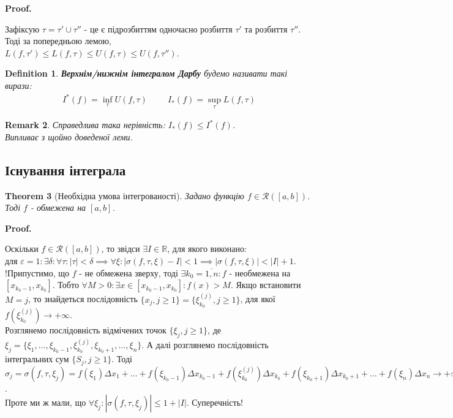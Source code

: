 \documentclass[a4paper, 10pt]{article}
\makeatletter
\def\qed{$\blacksquare$}
\theoremstyle{theoremdd}
\newtheorem{theorem}{Theorem}[subsection]
\theoremstyle{theoremdd}
\newtheorem{definition}[theorem]{Definition}
\theoremstyle{theoremdd}
\theoremstyle{theoremdd}
\theoremstyle{theoremdd}
\theoremstyle{theoremdd}
\newtheorem{remark}[theorem]{Remark}
\theoremstyle{theoremdd}
\theoremstyle{theoremdd}
\renewenvironment{proof}[1][Proof.\\]{\par
\pushQED{\hfill \qed}%
\normalfont \topsep6\p@\@plus6\p@\relax
\trivlist
\item\relax
{\bfseries
#1\@addpunct{.}}\hspace\labelsep\ignorespaces
}{%
\popQED\endtrivlist\@endpefalse
}
\makeatother
\begin{document}
\begin{proof}
Зафіксую $\tau = \tau' \cup \tau''$ - це є підрозбиттям одночасно розбиття $\tau'$ та розбиття $\tau''$. Тоді за попередньою лемою,\\
$L(f,\tau') \leq L(f,\tau) \leq U(f,\tau) \leq U(f,\tau'')$.
\end{proof}

\begin{definition}
\textbf{Верхнім/нижнім інтегралом Дарбу} будемо називати такі вирази:
\begin{align*}
I^*(f) = \inf_\tau U(f, \tau) \hspace{1cm} I_*(f) = \sup_\tau L(f,\tau)
\end{align*}
\end{definition}

\begin{remark}
Справедлива така нерівність: $I_*(f) \leq I^*(f)$.\\
\textit{Випливає з щойно доведеної леми.}
\end{remark}

\subsection{Існування інтеграла}
\begin{theorem}[Необхідна умова інтегрованості]
Задано функцію $f \in \mathcal{R}([a,b])$. Тоді $f$ - обмежена на $[a,b]$.
\end{theorem}

\begin{proof}
Оскільки $f \in \mathcal{R}([a,b])$, то звідси $\exists I \in \mathbb{R}$, для якого виконано:\\
для $\varepsilon = 1: \exists \delta: \forall \tau: |\tau| < \delta \implies \forall \xi: |\sigma(f, \tau, \xi) - I| < 1 \implies |\sigma(f, \tau, \xi)| < |I|+1$.\\
!Припустимо, що $f$ - не обмежена зверху, тоді $\exists k_0 = \overline{1,n}: f$ - необмежена на $[x_{k_0-1},x_{k_0}]$. Тобто $\forall M > 0: \exists x \in [x_{k_0-1},x_{k_0}]: f(x) > M$. Якщо встановити $M = j$, то знайдеться послідовність $\{x_j, j \geq 1\} = \{\xi_{k_0}^{(j)}, j \geq 1 \}$, для якої $f \left(\xi_{k_0}^{(j)} \right) \to +\infty$. \\
Розглянемо послідовність відмічених точок $\{\xi_j, j \geq 1\}$, де $\xi_j = \{\xi_1, \dots, \xi_{k_0-1}, \xi_{k_0}^{(j)}, \xi_{k_0+1}, \dots, \xi_n\}$. А далі розглянемо послідовність інтегральних сум $\{S_j, j \geq 1\}$. Тоді\\
$\sigma_j = \sigma(f,\tau,\xi_j) = f(\xi_1)\Delta x_1 + \dots + f(\xi_{k_0-1})\Delta x_{k_0-1} + f(\xi_{k_0}^{(j)}) \Delta x_{k_0} + f(\xi_{k_0+1}) \Delta x_{k_0+1} + \dots + f(\xi_n) \Delta x_n \to +\infty$.\\
Проте ми ж мали, що $\forall \xi_j: |\sigma(f,\tau, \xi_j)| \leq 1 + |I|$. Суперечність!
\end{proof}
\end{document}
